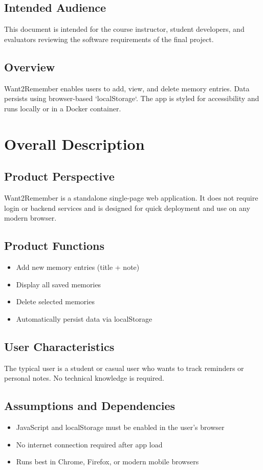 \documentclass[12pt]{article}
\begin{document}
\subsection*{Intended Audience}
This document is intended for the course instructor, student developers, and evaluators reviewing the software requirements of the final project.

\subsection*{Overview}
Want2Remember enables users to add, view, and delete memory entries. Data persists using browser-based `localStorage`. The app is styled for accessibility and runs locally or in a Docker container.

\section{Overall Description}
\subsection*{Product Perspective}
Want2Remember is a standalone single-page web application. It does not require login or backend services and is designed for quick deployment and use on any modern browser.

\subsection*{Product Functions}
\begin{itemize}
    \item Add new memory entries (title + note)
    \item Display all saved memories
    \item Delete selected memories
    \item Automatically persist data via localStorage
\end{itemize}

\subsection*{User Characteristics}
The typical user is a student or casual user who wants to track reminders or personal notes. No technical knowledge is required.

\subsection*{Assumptions and Dependencies}
\begin{itemize}
    \item JavaScript and localStorage must be enabled in the user’s browser
    \item No internet connection required after app load
    \item Runs best in Chrome, Firefox, or modern mobile browsers
\end{itemize}
\end{document}
